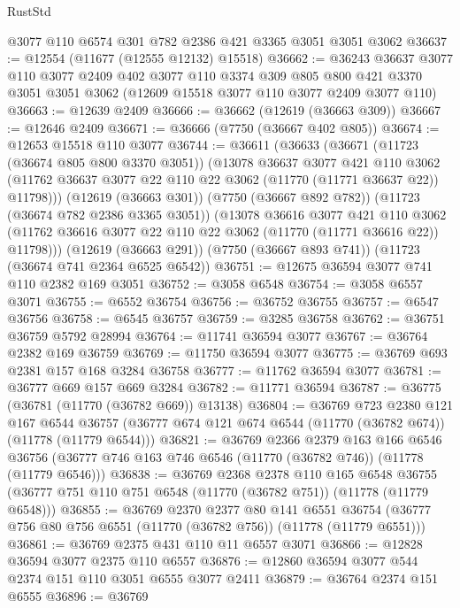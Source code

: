 \begin{lexlean}{RustStd}
\begin{coremodule}
    @3077
    @110
    @6574
    @301
    @782
    @2386
    @421
    @3365
    @3051
    @3051
    @3062
@36637 := @12554 (@11677 (@12555 @12132) @15518)
@36662 := @36243
    @36637
    @3077
    @110
    @3077
    @2409
    @402
    @3077
    @110
    @3374
    @309
    @805
    @800
    @421
    @3370
    @3051
    @3051
    @3062
    (@12609 @15518 @3077 @110 @3077 @2409 @3077 @110)
@36663 := @12639 @2409
@36666 := @36662 (@12619 (@36663 @309))
@36667 := @12646 @2409
@36671 := @36666 (@7750 (@36667 @402 @805))
@36674 := @12653 @15518 @110 @3077
@36744 := @36611
    (@36633
      (@36671
        (@11723 (@36674 @805 @800 @3370 @3051))
        (@13078
          @36637
          @3077
          @421
          @110
          @3062
          (@11762 @36637 @3077 @22 @110 @22 @3062 (@11770 (@11771 @36637 @22)) @11798)))
      (@12619 (@36663 @301))
      (@7750 (@36667 @892 @782))
      (@11723 (@36674 @782 @2386 @3365 @3051))
      (@13078
        @36616
        @3077
        @421
        @110
        @3062
        (@11762 @36616 @3077 @22 @110 @22 @3062 (@11770 (@11771 @36616 @22)) @11798)))
    (@12619 (@36663 @291))
    (@7750 (@36667 @893 @741))
    (@11723 (@36674 @741 @2364 @6525 @6542))
@36751 := @12675 @36594 @3077 @741 @110 @2382 @169 @3051
@36752 := @3058 @6548
@36754 := @3058 @6557 @3071
@36755 := @6552 @36754
@36756 := @36752 @36755
@36757 := @6547 @36756
@36758 := @6545 @36757
@36759 := @3285 @36758
@36762 := @36751 @36759 @5792 @28994
@36764 := @11741 @36594 @3077
@36767 := @36764 @2382 @169 @36759
@36769 := @11750 @36594 @3077
@36775 := @36769 @693 @2381 @157 @168 @3284 @36758
@36777 := @11762 @36594 @3077
@36781 := @36777 @669 @157 @669 @3284
@36782 := @11771 @36594
@36787 := @36775 (@36781 (@11770 (@36782 @669)) @13138)
@36804 := @36769
    @723
    @2380
    @121
    @167
    @6544
    @36757
    (@36777 @674 @121 @674 @6544 (@11770 (@36782 @674)) (@11778 (@11779 @6544)))
@36821 := @36769
    @2366
    @2379
    @163
    @166
    @6546
    @36756
    (@36777 @746 @163 @746 @6546 (@11770 (@36782 @746)) (@11778 (@11779 @6546)))
@36838 := @36769
    @2368
    @2378
    @110
    @165
    @6548
    @36755
    (@36777 @751 @110 @751 @6548 (@11770 (@36782 @751)) (@11778 (@11779 @6548)))
@36855 := @36769
    @2370
    @2377
    @80
    @141
    @6551
    @36754
    (@36777 @756 @80 @756 @6551 (@11770 (@36782 @756)) (@11778 (@11779 @6551)))
@36861 := @36769 @2375 @431 @110 @11 @6557 @3071
@36866 := @12828 @36594 @3077 @2375 @110 @6557
@36876 := @12860 @36594 @3077 @544 @2374 @151 @110 @3051 @6555 @3077 @2411
@36879 := @36764 @2374 @151 @6555
@36896 := @36769

\end{coremodule}
\end{lexlean}
